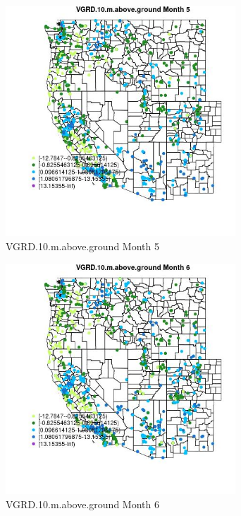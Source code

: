 \begin{figure} 
\centering  
\includegraphics[width=0.77\textwidth]{Code_Outputs/Report_ML_input_PM25_Step4_part_e_de_duplicated_aves_compiled_2019-05-21wNAs_MapObsMo5VGRD10maboveground.jpg} 
\caption{\label{fig:Report_ML_input_PM25_Step4_part_e_de_duplicated_aves_compiled_2019-05-21wNAsMapObsMo5VGRD10maboveground}VGRD.10.m.above.ground Month 5} 
\end{figure} 
 

\clearpage 

\begin{figure} 
\centering  
\includegraphics[width=0.77\textwidth]{Code_Outputs/Report_ML_input_PM25_Step4_part_e_de_duplicated_aves_compiled_2019-05-21wNAs_MapObsMo6VGRD10maboveground.jpg} 
\caption{\label{fig:Report_ML_input_PM25_Step4_part_e_de_duplicated_aves_compiled_2019-05-21wNAsMapObsMo6VGRD10maboveground}VGRD.10.m.above.ground Month 6} 
\end{figure} 
 

